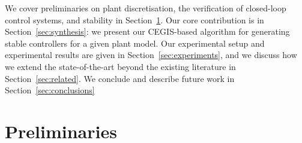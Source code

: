 \documentclass{sig-alternate-05-2015}
\newcommand{\blue}[1]{{\color{blue}#1}}
\begin{document}

We cover preliminaries on plant discretisation, the verification of
closed-loop control systems, and stability in
Section~\ref{sec:preliminaries}.  Our core contribution is in
Section~\ref{sec:synthesis}: we present our CEGIS-based algorithm for
generating stable controllers for a given plant model.  Our experimental
setup and experimental results are given in Section~\ref{sec:experiments},
and we discuss how we extend the state-of-the-art beyond the existing
literature in Section~\ref{sec:related}. We conclude and describe future
work in Section~\ref{sec:conclusions}

\section{Preliminaries}\label{sec:preliminaries}

\end{document}

